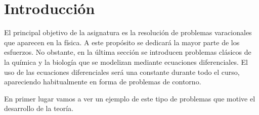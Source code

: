 \documentclass{article}
\begin{document}
\maketitle

\section{Introducción}

El principal objetivo de la asignatura es la resolución de problemas varacionales que aparecen en la
física. A este propósito se dedicará la mayor parte de los esfuerzos. No obstante, en la última
sección se introducen problemas clásicos de la química y la biología que se modelizan mediante
ecuaciones diferenciales. El uso de las ecuaciones diferenciales será una constante durante todo el
curso, apareciendo habitualmente en forma de problemas de contorno.

En primer lugar vamos a ver un ejemplo de este tipo de problemas que motive el desarrollo de la
teoría.
\end{document}
